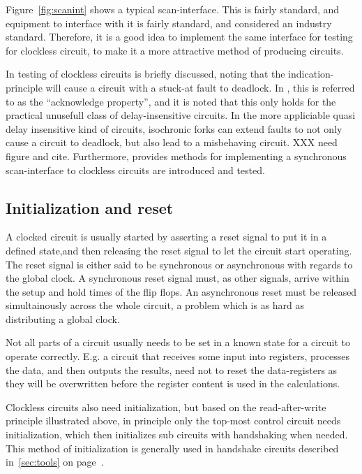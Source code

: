 Figure~\ref{fig:scanint} shows a typical scan-interface. This is
fairly standard, and equipment to interface with it is fairly
standard, and considered an industry standard. Therefore, it is
a good idea to implement the same interface for testing for clockless
circuit, to make it a more attractive method of producing circuits.

In \cite[pp. 27-28]{sparso} testing of clockless circuits is briefly
discussed, noting that the indication-principle will cause a circuit
with a stuck-at fault to deadlock. In \cite[pp. 26]{fullscan}, this is
referred to as the ``acknowledge property'', and it is noted that this
only holds for the practical unusefull class of delay-insensitive
circuits. In the more appliciable quasi delay insensitive kind of
circuits, isochronic forks can extend faults to not only cause a
circuit to deadlock, but also lead to a misbehaving circuit. XXX need
figure and cite.  Furthermore, \cite{fullscan} provides methods for
implementing a synchronous scan-interface to clockless circuits are
introduced and tested.

\subsection{Initialization and reset}

A clocked circuit is usually started by asserting a reset signal to
put it in a defined state,and then releasing the reset signal to let
the circuit start operating. The reset signal is either said to be
synchronous or asynchronous with regards to the global clock. A
synchronous reset signal must, as other signals, arrive within the
setup and hold times of the flip flops. An asynchronous reset must be
released simultainously across the whole circuit, a problem which is
as hard as distributing a global clock.

Not all parts of a circuit usually needs to be set in a known state
for a circuit to operate correctly. E.g. a circuit that receives some
input into registers, processes the data, and then outputs the
results, need not to reset the data-registers as they will be
overwritten before the register content is used in the calculations.

Clockless circuits also need initialization, but based on the
read-after-write principle illustrated above, in principle only the
top-most control circuit needs initialization, which then initializes
sub circuits with handshaking when needed. This method of
initialization is generally used in handshake circuits described
in~\ref{sec:tools} on page~\pageref{par:init}.

